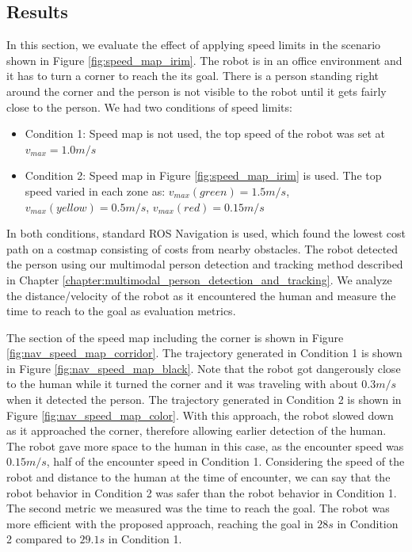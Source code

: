 \subsection{Results}
\label{sec:navigation_speed_maps_results}

In this section, we evaluate the effect of applying speed limits in the scenario shown in Figure \ref{fig:speed_map_irim}. The robot is in an office environment and it has to turn a corner to reach the its goal. There is a person standing right around the corner and the person is not visible to the robot until it gets fairly close to the person. We had two conditions of speed limits:

\begin{itemize}
\item Condition 1: Speed map is not used, the top speed of the robot was set at $v_{max}=1.0m/s$
\item Condition 2: Speed map in Figure \ref{fig:speed_map_irim} is used. The top speed varied in each zone as: $v_{max}(green)=1.5m/s$, $v_{max}(yellow)=0.5m/s$, $v_{max}(red)=0.15m/s$
\end{itemize}

In both conditions, standard ROS Navigation is used, which found the lowest cost path on a costmap consisting of costs from nearby obstacles. The robot detected the person using our multimodal person detection and tracking method described in Chapter \ref{chapter:multimodal_person_detection_and_tracking}. We analyze the distance/velocity of the robot as it encountered the human and measure the time to reach to the goal as evaluation metrics.

The section of the speed map including the corner is shown in Figure \ref{fig:nav_speed_map_corridor}. The trajectory generated in Condition 1 is shown in Figure \ref{fig:nav_speed_map_black}. Note that the robot got dangerously close to the human while it turned the corner and it was traveling with about $0.3m/s$ when it detected the person. The trajectory generated in Condition 2 is shown in Figure \ref{fig:nav_speed_map_color}. With this approach, the robot slowed down as it approached the corner, therefore allowing earlier detection of the human. The robot gave more space to the human in this case, as the encounter speed was  $0.15m/s$, half of the encounter speed in Condition 1. Considering the speed of the robot and distance to the human at the time of encounter, we can say that the robot behavior in Condition 2 was safer than the robot behavior in Condition 1. The second metric we measured was the time to reach the goal. The robot was more efficient with the proposed approach, reaching the goal in $28s$ in Condition 2 compared to $29.1s$ in Condition 1.



